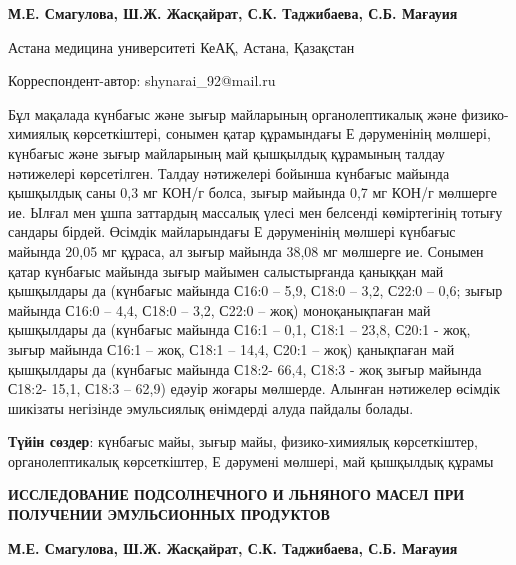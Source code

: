 
\begin{articleheader}

{\bfseries
М.Е. Смагулова,
Ш.Ж. Жасқайрат\textsuperscript{\envelope },
С.К. Таджибаева,
С.Б. Мағауия
}
\end{articleheader}

\begin{affiliation}
Астана медицина университеті КеАҚ, Астана, Қазақстан

\raggedright \textsuperscript{\envelope }Корреспондент-автор: shynarai\_92@mail.ru
\end{affiliation}

Бұл мақалада күнбағыс және зығыр майларының органолептикалық және
физико-химиялық көрсеткіштері, сонымен қатар құрамындағы Е дәруменінің
мөлшері, күнбағыс және зығыр майларының май қышқылдық құрамының талдау
нәтижелері көрсетілген. Талдау нәтижелері бойынша күнбағыс майында
қышқылдық саны 0,3 мг КОН/г болса, зығыр майында 0,7 мг КОН/г мөлшерге
ие. Ылғал мен ұшпа заттардың массалық үлесі мен белсенді көміртегінің
тотығу сандары бірдей. Өсімдік майларындағы Е дәруменінің мөлшері
күнбағыс майында 20,05 мг құраса, ал зығыр майында 38,08 мг мөлшерге ие.
Сонымен қатар күнбағыс майында зығыр майымен салыстырғанда қаныққан май
қышқылдары да (күнбағыс майында С16:0 -- 5,9, С18:0 -- 3,2, С22:0 --
0,6; зығыр майында С16:0 -- 4,4, С18:0 -- 3,2, С22:0 -- жоқ)
моноқанықпаған май қышқылдары да (күнбағыс майында С16:1 -- 0,1, С18:1
-- 23,8, С20:1 - жоқ, зығыр майында С16:1 -- жоқ, С18:1 -- 14,4, С20:1
-- жоқ) қанықпаған май қышқылдары да (күнбағыс майында С18:2- 66,4,
С18:3 - жоқ зығыр майында С18:2- 15,1, С18:3 -- 62,9) едәуір жоғары
мөлшерде. Алынған нәтижелер өсімдік шикізаты негізінде эмульсиялық
өнімдерді алуда пайдалы болады.

{\bfseries Түйін сөздер}: күнбағыс майы, зығыр майы, физико-химиялық
көрсеткіштер, органолептикалық көрсеткіштер, Е дәрумені мөлшері, май
қышқылдық құрамы

\begin{articleheader}
{\bfseries ИССЛЕДОВАНИЕ ПОДСОЛНЕЧНОГО И ЛЬНЯНОГО МАСЕЛ ПРИ ПОЛУЧЕНИИ
ЭМУЛЬСИОННЫХ ПРОДУКТОВ}

{\bfseries
М.Е. Смагулова,
Ш.Ж. Жасқайрат\textsuperscript{\envelope },
С.К. Таджибаева,
С.Б. Мағауия
}
\end{articleheader}

